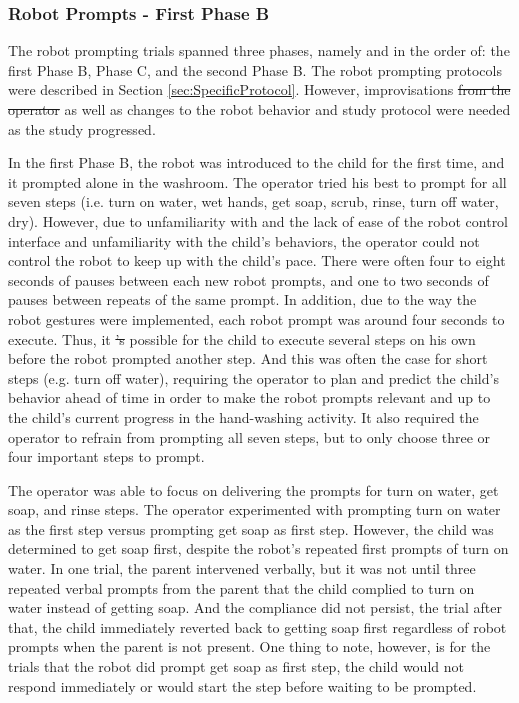 \documentclass{ut-thesis}
\providecommand{\DIFaddtex}[1]{{\protect\color{blue}\uwave{#1}}} %
\providecommand{\DIFdeltex}[1]{{\protect\color{red}\sout{#1}}}                      %
\providecommand{\DIFaddbegin}{} %
\providecommand{\DIFaddend}{} %
\providecommand{\DIFdelbegin}{} %
\providecommand{\DIFdelend}{} %
\providecommand{\DIFadd}[1]{\texorpdfstring{\DIFaddtex{#1}}{#1}} %
\providecommand{\DIFdel}[1]{\texorpdfstring{\DIFdeltex{#1}}{}} %
\begin{document}
\subsubsection{Robot \DIFaddbegin \DIFadd{Alone }\DIFaddend Prompts - First Phase B}
The robot prompting trials spanned three phases, namely and in the order of: the first Phase B, Phase C, and the second Phase B.  The robot prompting protocols were described in Section \ref{sec:SpecificProtocol}.  However, improvisations \DIFdelbegin \DIFdel{from the operator }\DIFdelend \DIFaddbegin \DIFadd{by the operator (i.e. the researcher) }\DIFaddend as well as changes to the robot behavior and study protocol were needed as the study progressed.

In the first Phase B, the robot was introduced to the child for the first time, and it prompted alone in the washroom.  The operator tried his best to prompt for all seven steps (i.e. turn on water, wet hands, get soap, scrub, rinse, turn off water, dry).  However, due to unfamiliarity with and the lack of ease of the robot control interface and unfamiliarity with the child's behaviors, the operator could not control the robot to keep up with the child's pace.  There were often four to eight seconds of pauses between each new robot prompts, and one to two seconds of pauses between repeats of the same prompt.  In addition, due to the way the robot gestures were implemented, each robot prompt was around four seconds to execute.  Thus, it \DIFdelbegin \DIFdel{'s }\DIFdelend \DIFaddbegin \DIFadd{was }\DIFaddend possible for the child to execute several steps on his own before the robot prompted another step.  And this was often the case for short steps (e.g. turn off water), requiring the operator to plan and predict the child's behavior ahead of time in order to make the robot prompts relevant and up to the child's current progress in the hand-washing activity.  It also required the operator to refrain from prompting all seven steps, but to only choose three or four important steps to prompt.

The operator was able to focus on delivering the prompts for turn on water, get soap, and rinse steps.  The operator experimented with prompting turn on water as the first step versus prompting get soap as first step.  However, the child was determined to get soap first, despite the robot's repeated first prompts of turn on water.  In one trial, the parent intervened verbally, but it was not until three repeated verbal prompts from the parent that the child complied to turn on water instead of getting soap.  And the compliance did not persist, the trial after that, the child immediately reverted back to getting soap first regardless of robot prompts when the parent is not present.  One thing to note, however, is for the trials that the robot did prompt get soap as first step, the child would not respond immediately or would start the step before waiting to be prompted.
\end{document}
